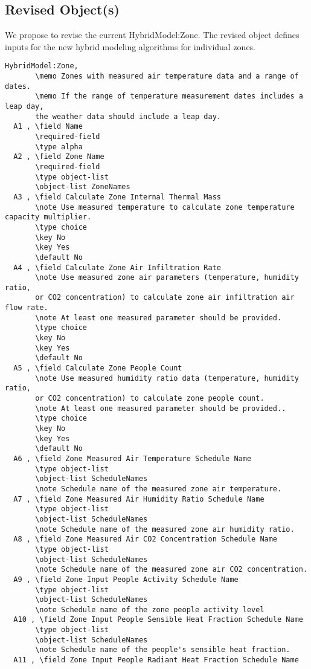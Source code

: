\documentclass[11pt]{article}
\begin{document}
\subsection{Revised Object(s)}
We propose to revise the current HybridModel:Zone. The revised object defines inputs for the new hybrid modeling algorithms for individual zones. 
\begin{verbatim}
HybridModel:Zone,
       \memo Zones with measured air temperature data and a range of dates.
       \memo If the range of temperature measurement dates includes a leap day, 
       the weather data should include a leap day.
  A1 , \field Name
       \required-field
       \type alpha
  A2 , \field Zone Name
       \required-field
       \type object-list
       \object-list ZoneNames
  A3 , \field Calculate Zone Internal Thermal Mass
       \note Use measured temperature to calculate zone temperature capacity multiplier.
       \type choice
       \key No
       \key Yes
       \default No
  A4 , \field Calculate Zone Air Infiltration Rate
       \note Use measured zone air parameters (temperature, humidity ratio, 
       or CO2 concentration) to calculate zone air infiltration air flow rate.
       \note At least one measured parameter should be provided.
       \type choice
       \key No
       \key Yes
       \default No
  A5 , \field Calculate Zone People Count
       \note Use measured humidity ratio data (temperature, humidity ratio, 
       or CO2 concentration) to calculate zone people count.
       \note At least one measured parameter should be provided..
       \type choice
       \key No
       \key Yes
       \default No
  A6 , \field Zone Measured Air Temperature Schedule Name
       \type object-list
       \object-list ScheduleNames
       \note Schedule name of the measured zone air temperature.
  A7 , \field Zone Measured Air Humidity Ratio Schedule Name
       \type object-list
       \object-list ScheduleNames
       \note Schedule name of the measured zone air humidity ratio.
  A8 , \field Zone Measured Air CO2 Concentration Schedule Name
       \type object-list
       \object-list ScheduleNames
       \note Schedule name of the measured zone air CO2 concentration.
  A9 , \field Zone Input People Activity Schedule Name
       \type object-list
       \object-list ScheduleNames
       \note Schedule name of the zone people activity level
  A10 , \field Zone Input People Sensible Heat Fraction Schedule Name
       \type object-list
       \object-list ScheduleNames
       \note Schedule name of the people's sensible heat fraction.
  A11 , \field Zone Input People Radiant Heat Fraction Schedule Name

\end{verbatim}
\end{document}
